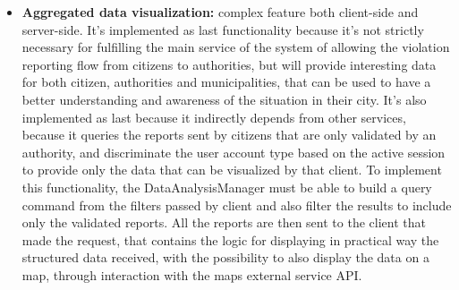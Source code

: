 \begin{itemize}
	\item \textbf{Aggregated data visualization:} complex feature both client-side and server-side. It's implemented as last functionality because it's not strictly necessary for fulfilling the main service of the system of allowing the violation reporting flow from citizens to authorities, but will provide interesting data for both citizen, authorities and municipalities, that can be used to have a better understanding and awareness of the situation in their city. It's also implemented as last because it indirectly depends from other services, because it queries the reports sent by citizens that are only validated by an authority, and discriminate the user account type based on the active session to provide only the data that can be visualized by that client. To implement this functionality, the DataAnalysisManager must be able to build a query command from the filters passed by client and also filter the results to include only the validated reports. All the reports are then sent to the client that made the request, that contains the logic for displaying in practical way the structured data received, with the possibility to also display the data on a map, through interaction with the maps external service API.
\end{itemize}